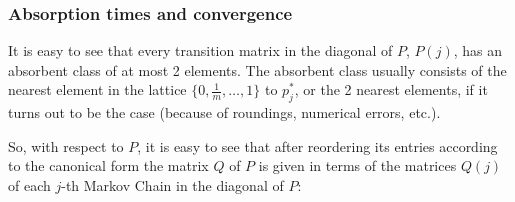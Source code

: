 \documentclass{article}
\begin{document}
\subsubsection*{Absorption times and convergence}
It is easy to see that every transition matrix in the diagonal of $P$, $P(j)$, has an absorbent class of at most 2 elements. The absorbent class usually consists of the nearest element in the lattice $\{0,\frac{1}{m}, \dots, 1\}$ to $p^*_j$, or the 2 nearest elements, if it turns out to be the case (because of roundings, numerical errors, etc.).\par
So, with respect to $P$, it is easy to see that after reordering its entries according to the canonical form the matrix $Q$ of $P$ is given in terms of the matrices $Q(j)$ of each $j$-th Markov Chain in the diagonal of $P$:
\end{document}
